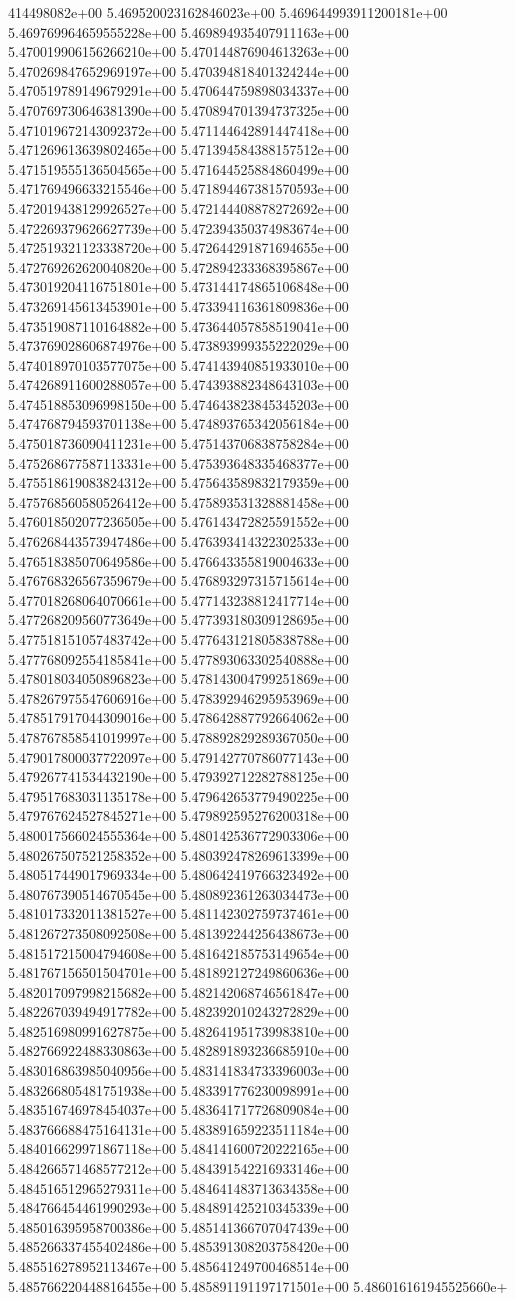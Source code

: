 414498082e+00	5.469520023162846023e+00	5.469644993911200181e+00	5.469769964659555228e+00	5.469894935407911163e+00	5.470019906156266210e+00	5.470144876904613263e+00	5.470269847652969197e+00	5.470394818401324244e+00	5.470519789149679291e+00	5.470644759898034337e+00	5.470769730646381390e+00	5.470894701394737325e+00	5.471019672143092372e+00	5.471144642891447418e+00	5.471269613639802465e+00	5.471394584388157512e+00	5.471519555136504565e+00	5.471644525884860499e+00	5.471769496633215546e+00	5.471894467381570593e+00	5.472019438129926527e+00	5.472144408878272692e+00	5.472269379626627739e+00	5.472394350374983674e+00	5.472519321123338720e+00	5.472644291871694655e+00	5.472769262620040820e+00	5.472894233368395867e+00	5.473019204116751801e+00	5.473144174865106848e+00	5.473269145613453901e+00	5.473394116361809836e+00	5.473519087110164882e+00	5.473644057858519041e+00	5.473769028606874976e+00	5.473893999355222029e+00	5.474018970103577075e+00	5.474143940851933010e+00	5.474268911600288057e+00	5.474393882348643103e+00	5.474518853096998150e+00	5.474643823845345203e+00	5.474768794593701138e+00	5.474893765342056184e+00	5.475018736090411231e+00	5.475143706838758284e+00	5.475268677587113331e+00	5.475393648335468377e+00	5.475518619083824312e+00	5.475643589832179359e+00	5.475768560580526412e+00	5.475893531328881458e+00	5.476018502077236505e+00	5.476143472825591552e+00	5.476268443573947486e+00	5.476393414322302533e+00	5.476518385070649586e+00	5.476643355819004633e+00	5.476768326567359679e+00	5.476893297315715614e+00	5.477018268064070661e+00	5.477143238812417714e+00	5.477268209560773649e+00	5.477393180309128695e+00	5.477518151057483742e+00	5.477643121805838788e+00	5.477768092554185841e+00	5.477893063302540888e+00	5.478018034050896823e+00	5.478143004799251869e+00	5.478267975547606916e+00	5.478392946295953969e+00	5.478517917044309016e+00	5.478642887792664062e+00	5.478767858541019997e+00	5.478892829289367050e+00	5.479017800037722097e+00	5.479142770786077143e+00	5.479267741534432190e+00	5.479392712282788125e+00	5.479517683031135178e+00	5.479642653779490225e+00	5.479767624527845271e+00	5.479892595276200318e+00	5.480017566024555364e+00	5.480142536772903306e+00	5.480267507521258352e+00	5.480392478269613399e+00	5.480517449017969334e+00	5.480642419766323492e+00	5.480767390514670545e+00	5.480892361263034473e+00	5.481017332011381527e+00	5.481142302759737461e+00	5.481267273508092508e+00	5.481392244256438673e+00	5.481517215004794608e+00	5.481642185753149654e+00	5.481767156501504701e+00	5.481892127249860636e+00	5.482017097998215682e+00	5.482142068746561847e+00	5.482267039494917782e+00	5.482392010243272829e+00	5.482516980991627875e+00	5.482641951739983810e+00	5.482766922488330863e+00	5.482891893236685910e+00	5.483016863985040956e+00	5.483141834733396003e+00	5.483266805481751938e+00	5.483391776230098991e+00	5.483516746978454037e+00	5.483641717726809084e+00	5.483766688475164131e+00	5.483891659223511184e+00	5.484016629971867118e+00	5.484141600720222165e+00	5.484266571468577212e+00	5.484391542216933146e+00	5.484516512965279311e+00	5.484641483713634358e+00	5.484766454461990293e+00	5.484891425210345339e+00	5.485016395958700386e+00	5.485141366707047439e+00	5.485266337455402486e+00	5.485391308203758420e+00	5.485516278952113467e+00	5.485641249700468514e+00	5.485766220448816455e+00	5.485891191197171501e+00	5.486016161945525660e+
